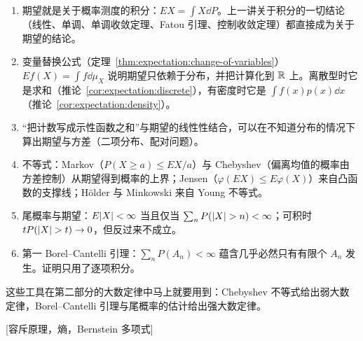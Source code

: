 \begin{enumerate}
\item 期望就是关于概率测度的积分：$EX=\int X\dd P$。上一讲关于积分的一切结论（线性、单调、单调收敛定理、Fatou 引理、控制收敛定理）都直接成为关于期望的结论。
\item 变量替换公式（定理~\ref{thm:expectation:change-of-variables}）$Ef(X)=\int f\dd\mu_X$ 说明期望只依赖于分布，并把计算化到 $\mathbb{R}$ 上。离散型时它是求和（推论~\ref{cor:expectation:discrete}），有密度时它是 $\int f(x)p(x)\dd x$（推论~\ref{cor:expectation:density}）。
\item “把计数写成示性函数之和”与期望的线性性结合，可以在不知道分布的情况下算出期望与方差（二项分布、配对问题）。
\item 不等式：Markov（$P(X\geqslant a)\leqslant EX/a$）与 Chebyshev（偏离均值的概率由方差控制）从期望得到概率的上界；Jensen（$\varphi(EX)\leqslant E\varphi(X)$）来自凸函数的支撑线；Hölder 与 Minkowski 来自 Young 不等式。
\item 尾概率与期望：$E\lvert X\rvert<\infty$ 当且仅当 $\sum_nP(\lvert X\rvert>n)<\infty$；可积时 $tP(\lvert X\rvert>t)\to0$，但反过来不成立。
\item 第一 Borel--Cantelli 引理：$\sum_nP(A_n)<\infty$ 蕴含几乎必然只有有限个 $A_n$ 发生。证明只用了逐项积分。
\end{enumerate}
这些工具在第二部分的大数定律中马上就要用到：Chebyshev 不等式给出弱大数定律，Borel--Cantelli 引理与尾概率的估计给出强大数定律。

[容斥原理，熵，Bernstein 多项式]
\label{hw:expectation}


